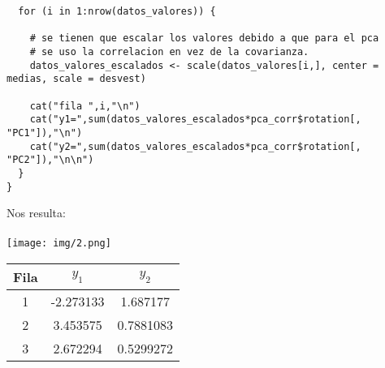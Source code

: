 \begin{sol}
\begin{verbatim}
  for (i in 1:nrow(datos_valores)) {

    # se tienen que escalar los valores debido a que para el pca
    # se uso la correlacion en vez de la covarianza.
    datos_valores_escalados <- scale(datos_valores[i,], center = medias, scale = desvest)

    cat("fila ",i,"\n")
    cat("y1=",sum(datos_valores_escalados*pca_corr$rotation[, "PC1"]),"\n")
    cat("y2=",sum(datos_valores_escalados*pca_corr$rotation[, "PC2"]),"\n\n")
  }
}
\end{verbatim}
Nos resulta:\\\\
\texttt{[image: img/2.png]}\\
\begin{table}[ht]
    \centering
    \begin{tabular}{|c|c|c|}
        \hline
        \textbf{Fila} & $y_1$ & $y_2$ \\
        \hline
        1 & -2.273133 & 1.687177 \\
        2 & 3.453575 & 0.7881083 \\
        3 & 2.672294 & 0.5299272 \\
        \hline
    \end{tabular}
\end{table}


\end{sol}
